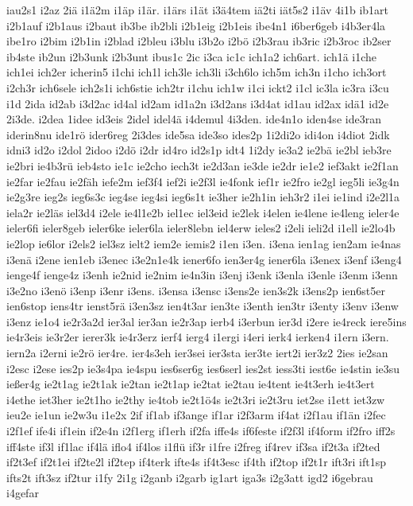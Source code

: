{iau2s1
i2az
2iä
i1ä2m
i1äp
i1är.
i1ärs
i1ät
i3ä4tem
iä2ti
iät5s2
i1äv
4i1b
ib1art
i2b1auf
i2b1aus
i2baut
ib3be
ib2bli
i2b1eig
i2b1eis
ibe4n1
i6ber6geb
i4b3er4la
ibe1ro
i2bim
i2b1in
i2blad
i2bleu
i3blu
i3b2o
i2bö
i2b3rau
ib3ric
i2b3roc
ib2ser
ib4ste
ib2un
i2b3unk
i2b3unt
ibus1c
2ic
i3ca
ic1c
ich1a2
ich6art.
ich1ä
i1che
ich1ei
ich2er
icherin5
i1chi
ich1l
ich3le
ich3li
i3ch6lo
ich5m
ich3n
i1cho
ich3ort
i2ch3r
ich6sele
ich2s1i
ich6stie
ich2tr
i1chu
ich1w
i1ci
ickt2
i1cl
ic3la
ic3ra
i3cu
i1d
2ida
id2ab
i3d2ac
id4al
id2am
id1a2n
i3d2ans
i3d4at
id1au
id2ax
idä1
id2e
2i3de.
i2dea
1idee
id3eis
2idel
idel4ä
i4demul
4i3den.
ide4n1o
iden4se
ide3ran
iderin8nu
ide1rö
ider6reg
2i3des
ide5sa
ide3so
ides2p
1i2di2o
idi4on
i4diot
2idk
idni3
id2o
i2dol
2idoo
i2dö
i2dr
id4ro
id2s1p
idt4
1i2dy
ie3a2
ie2bä
ie2bl
ieb3re
ie2bri
ie4b3rü
ieb4sto
ie1c
ie2cho
iech3t
ie2d3an
ie3de
ie2dr
ie1e2
ief3akt
ie2f1an
ie2far
ie2fau
ie2fäh
iefe2m
ief3f4
ief2i
ie2f3l
ie4fonk
ief1r
ie2fro
ie2gl
ieg5li
ie3g4n
ie2g3re
ieg2s
ieg6s3c
ieg4se
ieg4si
ieg6s1t
ie3her
ie2h1in
ieh3r2
i1ei
ie1ind
i2e2l1a
iela2r
ie2läs
iel3d4
i2ele
ie4l1e2b
iel1ec
iel3eid
ie2lek
i4elen
ie4lene
ie4leng
ieler4e
ieler6fi
ieler8geb
ieler6ke
ieler6la
ieler8lebn
iel4erw
ieles2
i2eli
ieli2d
i1ell
ie2lo4b
ie2lop
ie6lor
i2els2
iel3sz
ielt2
iem2e
iemis2
i1en
i3en.
i3ena
ien1ag
ien2am
ie4nas
i3enä
i2ene
ien1eb
i3enec
i3e2n1e4k
iener6fo
ien3er4g
iener6la
i3enex
i3enf
i3eng4
ienge4f
ienge4z
i3enh
ie2nid
ie2nim
ie4n3in
i3enj
i3enk
i3enla
i3enle
i3enm
i3enn
i3e2no
i3enö
i3enp
i3enr
i3ens.
i3ensa
i3ensc
i3ens2e
ien3s2k
i3ens2p
ien6st5er
ien6stop
iens4tr
ienst5rä
i3en3sz
ien4t3ar
ien3te
i3enth
ien3tr
i3enty
i3env
i3enw
i3enz
ie1o4
ie2r3a2d
ier3al
ier3an
ie2r3ap
ierb4
i3erbun
ier3d
i2ere
ie4reck
iere5ins
ie4r3eis
ie3r2er
ierer3k
ie4r3erz
ierf4
ierg4
i1ergi
i4eri
ierk4
ierken4
i1ern
i3ern.
iern2a
i2erni
ie2rö
ier4re.
ier4s3eh
ier3sei
ier3sta
ier3te
iert2i
ier3z2
2ies
ie2san
i2esc
i2ese
ies2p
ie3s4pa
ie4spu
ies6ser6g
ies6serl
ies2st
iess3ti
iest6e
ie4stin
ie3su
ießer4g
ie2t1ag
ie2t1ak
ie2tan
ie2t1ap
ie2tat
ie2tau
ie4tent
ie4t3erh
ie4t3ert
i4ethe
iet3her
ie2t1ho
ie2thy
ie4tob
ie2t1ö4s
ie2t3ri
ie2t3ru
iet2se
i1ett
iet3zw
ieu2e
ie1un
ie2w3u
i1e2x
2if
if1ab
if3ange
if1ar
i2f3arm
if4at
i2f1au
if1än
i2fec
i2f1ef
ife4i
if1ein
if2e4n
i2f1erg
if1erh
if2fa
iffe4s
if6feste
if2f3l
if4form
if2fro
iff2s
iff4ste
if3l
if1lac
if4lä
iflo4
if4los
i1flü
if3r
i1fre
i2freg
if4rev
if3sa
if2t3a
if2ted
if2t3ef
if2t1ei
if2te2l
if2tep
if4terk
ifte4s
if4t3esc
if4th
if2top
if2t1r
ift3ri
ift1sp
ifts2t
ift3sz
if2tur
i1fy
2i1g
i2ganb
i2garb
ig1art
iga3s
i2g3att
igd2
i6gebrau
i4gefar
}
